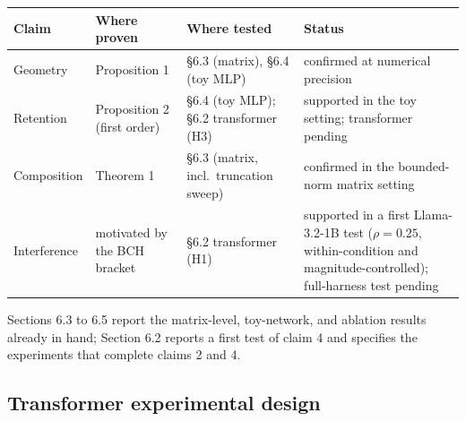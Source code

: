\documentclass[
]{article}
\newcounter{none} %
\begin{document}
{\def\LTcaptype{none} %
\begin{longtable}[]{@{}
  >{\raggedright\arraybackslash}p{}
  >{\raggedright\arraybackslash}p{}
  >{\raggedright\arraybackslash}p{}
  >{\raggedright\arraybackslash}p{}@{}}
\toprule\noalign{}
\begin{minipage}[b]{\linewidth}\raggedright
Claim
\end{minipage} & \begin{minipage}[b]{\linewidth}\raggedright
Where proven
\end{minipage} & \begin{minipage}[b]{\linewidth}\raggedright
Where tested
\end{minipage} & \begin{minipage}[b]{\linewidth}\raggedright
Status
\end{minipage} \\
\midrule\noalign{}
\endhead
\bottomrule\noalign{}
\endlastfoot
1 Geometry & Proposition 1 & §6.3 (matrix), §6.4 (toy MLP) & confirmed at numerical precision \\
2 Retention & Proposition 2 (first order) & §6.4 (toy MLP); §6.2 transformer (H3) & supported in the toy setting; transformer pending \\
3 Composition & Theorem 1 & §6.3 (matrix, incl.~truncation sweep) & confirmed in the bounded-norm matrix setting \\
4 Interference & motivated by the BCH bracket & §6.2 transformer (H1) & supported in a first Llama-3.2-1B test (\(\rho=0.25\), within-condition and magnitude-controlled); full-harness test pending \\
\end{longtable}
}

Sections 6.3 to 6.5 report the matrix-level, toy-network, and ablation results already in hand; Section 6.2 reports a first test of claim 4 and specifies the experiments that complete claims 2 and 4.

\subsection{Transformer experimental design}\label{transformer-experimental-design}
\end{document}
